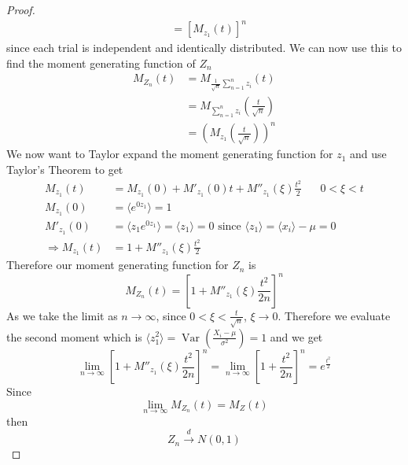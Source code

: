 \documentclass{article}
\newcommand{\twen}{\hspace{20pt}}
\begin{document}
\begin{proof}
\begin{equation*}
\begin{split}
            &= \left[ M_{z_1}(t)\right]^n
        \end{split}
    \end{equation*}
    since each trial is independent and identically distributed. We can now use this to find the moment generating function of $Z_n$
    \begin{equation*}
        \begin{split}
            M_{Z_n}(t) &= M_{\frac{1}{\sqrt{n}}\sum^n_{n=1} z_i}(t) \\
            &= M_{\sum^n_{n=1}z_i}\left(\frac{t}{\sqrt{n}}\right)\\
            &= \left( M_{z_1} \left(\frac{t}{\sqrt{n}} \right) \right)^n
        \end{split}
    \end{equation*}
    We now want to Taylor expand the moment generating function for $z_1$ and use Taylor's Theorem to get 
    \begin{equation*}
        \begin{split}
            M_{z_1}(t) &= M_{z_1}(0) + M'_{z_1}(0)t+M''_{z_1}(\xi) \frac{t^2}{2} \twen 0<\xi <t \\ M_{z_1}(0)&= \langle e^{0z_1}\rangle = 1 \\
            M'_{z_1}(0)&= \langle z_1 e^{0z_1}\rangle = \langle z_1 \rangle = 0 \text{ since } \langle z_1 \rangle = \langle x_i \rangle -\mu =0 \\
            \Rightarrow M_{z_1}(t)&= 1+M''_{z_1}(\xi) \frac{t^2}{2}
        \end{split}
    \end{equation*}
    Therefore our moment generating function for $Z_n$ is 
    \begin{equation*}
        M_{Z_n}(t) = \left[ 1+ M''_{z_1}(\xi) \frac{t^2}{2n}\right]^n
    \end{equation*}
    As we take the limit as $n\to \infty$, since $0 < \xi  <\frac{t}{\sqrt n}$, $\xi \to 0$. Therefore we evaluate the second moment which is $\langle z_1^2\rangle = \operatorname{Var}\left(\frac{X_i-\mu}{\sigma^2} \right) = 1$ and we get 
    \begin{equation*}
        \lim_{n\to \infty}\left[ 1+ M''_{z_1}(\xi) \frac{t^2}{2n}\right]^n = \lim_{n\to \infty} \left[ 1+\frac{t^2}{2n} \right]^n = e^{\frac{t^2}{2}}
    \end{equation*}
    Since 
    \begin{equation*}
        \lim_{n\to \infty}M_{Z_n}(t) = M_Z(t)
    \end{equation*}
    then 
    \begin{equation*}
        Z_n \overset{d}{\longrightarrow}N(0,1)
    \end{equation*}
\end{proof}
\end{document}
